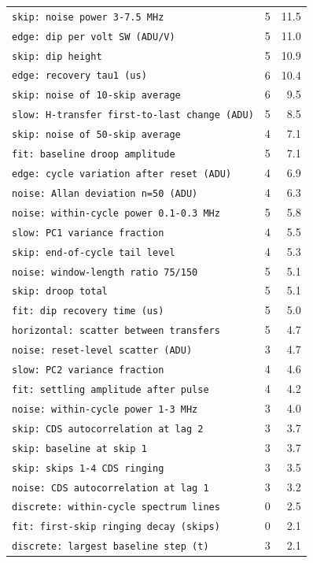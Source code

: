 \documentclass[10pt]{article}
\begin{document}
\begin{longtable}{>{\raggedright\arraybackslash}p{}rr}
\texttt{skip: noise power 3-7.5 MHz} & 5 & 11.5 \\
\texttt{edge: dip per volt SW (ADU/V)} & 5 & 11.0 \\
\texttt{skip: dip height} & 5 & 10.9 \\
\texttt{edge: recovery tau1 (us)} & 6 & 10.4 \\
\texttt{skip: noise of 10-skip average} & 6 & 9.5 \\
\texttt{slow: H-transfer first-to-last change (ADU)} & 5 & 8.5 \\
\texttt{skip: noise of 50-skip average} & 4 & 7.1 \\
\texttt{fit: baseline droop amplitude} & 5 & 7.1 \\
\texttt{edge: cycle variation after reset (ADU)} & 4 & 6.9 \\
\texttt{noise: Allan deviation n=50 (ADU)} & 4 & 6.3 \\
\texttt{noise: within-cycle power 0.1-0.3 MHz} & 5 & 5.8 \\
\texttt{slow: PC1 variance fraction} & 4 & 5.5 \\
\texttt{skip: end-of-cycle tail level} & 4 & 5.3 \\
\texttt{noise: window-length ratio 75/150} & 5 & 5.1 \\
\texttt{skip: droop total} & 5 & 5.1 \\
\texttt{fit: dip recovery time (us)} & 5 & 5.0 \\
\texttt{horizontal: scatter between transfers} & 5 & 4.7 \\
\texttt{noise: reset-level scatter (ADU)} & 3 & 4.7 \\
\texttt{slow: PC2 variance fraction} & 4 & 4.6 \\
\texttt{fit: settling amplitude after pulse} & 4 & 4.2 \\
\texttt{noise: within-cycle power 1-3 MHz} & 3 & 4.0 \\
\texttt{skip: CDS autocorrelation at lag 2} & 3 & 3.7 \\
\texttt{skip: baseline at skip 1} & 3 & 3.7 \\
\texttt{skip: skips 1-4 CDS ringing} & 3 & 3.5 \\
\texttt{noise: CDS autocorrelation at lag 1} & 3 & 3.2 \\
\texttt{discrete: within-cycle spectrum lines} & 0 & 2.5 \\
\texttt{fit: first-skip ringing decay (skips)} & 0 & 2.1 \\
\texttt{discrete: largest baseline step (t)} & 3 & 2.1 \\

\end{longtable}
\end{document}
